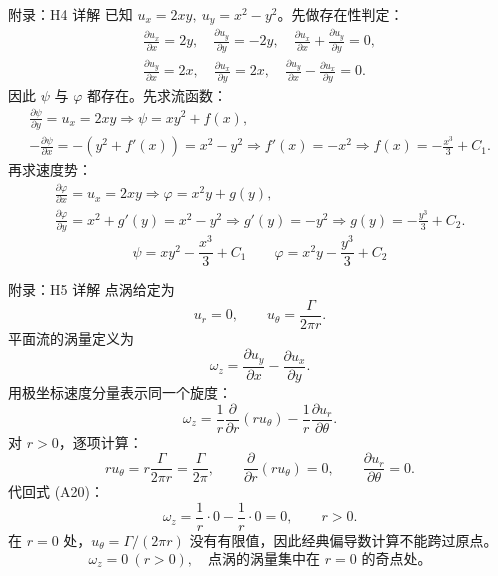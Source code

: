 \documentclass[aspectratio=169,10pt]{beamer}
\newcommand{\pd}[2]{\frac{\partial #1}{\partial #2}}
\begin{document}
\begin{frame}{附录：H4 详解}
  \scriptsize
  \setlength{\abovedisplayskip}{1pt}
  \setlength{\belowdisplayskip}{1pt}
  \setlength{\abovedisplayshortskip}{1pt}
  \setlength{\belowdisplayshortskip}{1pt}
  已知 $u_x=2xy,\ u_y=x^2-y^2$。先做存在性判定：
  \begin{align*}
    \pd{u_x}{x}=2y,\quad \pd{u_y}{y}=-2y,
    \quad \pd{u_x}{x}+\pd{u_y}{y}=0, \tag{A12}\\[-1pt]
    \pd{u_y}{x}=2x,\quad \pd{u_x}{y}=2x,
    \quad \pd{u_y}{x}-\pd{u_x}{y}=0. \tag{A13}
  \end{align*}
  因此 $\psi$ 与 $\varphi$ 都存在。先求流函数：
  \begin{align*}
    \pd{\psi}{y}=u_x=2xy
    \Rightarrow
    \psi=xy^2+f(x), \tag{A14}\\[-1pt]
    -\pd{\psi}{x}=-(y^2+f'(x))=x^2-y^2
    \Rightarrow
    f'(x)=-x^2
    \Rightarrow
    f(x)=-\frac{x^3}{3}+C_1. \tag{A15}
  \end{align*}
  再求速度势：
  \begin{align*}
    \pd{\varphi}{x}=u_x=2xy
    \Rightarrow
    \varphi=x^2y+g(y), \tag{A16}\\[-1pt]
    \pd{\varphi}{y}=x^2+g'(y)=x^2-y^2
    \Rightarrow
    g'(y)=-y^2
    \Rightarrow
    g(y)=-\frac{y^3}{3}+C_2. \tag{A17}
  \end{align*}
  \[
    \boxed{\psi=xy^2-\frac{x^3}{3}+C_1}
    \qquad
    \boxed{\varphi=x^2y-\frac{y^3}{3}+C_2}
  \]
\end{frame}

\begin{frame}{附录：H5 详解}
  \footnotesize
  \setlength{\abovedisplayskip}{2pt}
  \setlength{\belowdisplayskip}{2pt}
  \setlength{\abovedisplayshortskip}{1pt}
  \setlength{\belowdisplayshortskip}{1pt}
  点涡给定为
  \[
    u_r=0,\qquad u_\theta=\frac{\Gamma}{2\pi r}. \tag{A18}
  \]
  平面流的涡量定义为
  \[
    \omega_z=\pd{u_y}{x}-\pd{u_x}{y}. \tag{A19}
  \]
  用极坐标速度分量表示同一个旋度：
  \[
    \omega_z
      =\frac{1}{r}\pd{}{r}(r u_\theta)
       -\frac{1}{r}\pd{u_r}{\theta}. \tag{A20}
  \]
  对 $r>0$，逐项计算：
  \[
    r u_\theta
      =r\frac{\Gamma}{2\pi r}
      =\frac{\Gamma}{2\pi},
    \qquad
    \pd{}{r}(r u_\theta)=0,
    \qquad
    \pd{u_r}{\theta}=0. \tag{A21}
  \]
  代回式 (A20)：
  \[
    \omega_z=\frac{1}{r}\cdot0-\frac{1}{r}\cdot0=0,
    \qquad r>0. \tag{A22}
  \]
  在 $r=0$ 处，$u_\theta=\Gamma/(2\pi r)$ 没有有限值，因此经典偏导数计算不能跨过原点。
  \[
    \boxed{\omega_z=0\ (r>0),\quad \text{点涡的涡量集中在 }r=0\text{ 的奇点处。}}
  \]
\end{frame}
\end{document}
